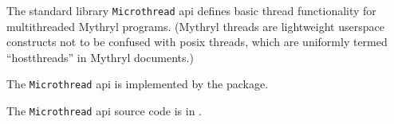 
The standard library {\tt Microthread} api defines basic thread functionality for multithreaded Mythryl programs.
(Mythryl threads are lightweight userspace constructs not to be confused with posix threads, which are 
uniformly termed ``hostthreads'' in Mythryl documents.)

The {\tt Microthread} api is implemented by the  package.

The {\tt Microthread} api source code is in .
